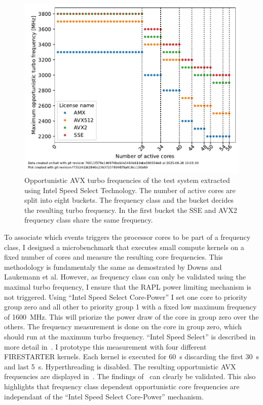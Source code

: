 \begin{figure}[]
    \centering
    \includegraphics[width=0.8\columnwidth]{fig/avx-frequency-license-bands/avx-frequency-license-bands.pdf}
    \caption{\label{fig:p0n-frequencies}Opportunistic AVX turbo frequencies of the test system extracted using Intel Speed Select Technology.
    The number of active cores are split into eight buckets. The frequency class and the bucket decides the resulting turbo frequency.
    In the first bucket the SSE and AVX2 frequency class share the same frequency.}
\end{figure}


To associate which events triggers the processor cores to be part of a frequency class, I designed a microbenchmark that executes small compute kernels on a fixed number of cores and measure the resulting core frequencies.
This methodology is fundamentaly the same as demostrated by Downs and Laukemann et al.
However, as frequency class can only be validated using the maximal turbo frequency,
I ensure that the RAPL power limiting mechanism is not triggered.
Using ``Intel Speed Select Core-Power'' I set one core to priority group zero and all other to priority group 1 with a fixed low maximum frequency of \SI{1600}{\MHz}.
This will priorize the power draw of the core in group zero over the others.
The frequency measurement is done on the core in group zero, which should run at the maximum turbo frequency.
``Intel Speed Select'' is described in more detail in~.
I prototype this measurement with four different FIRESTARTER kernels.
Each kernel is executed for \SI{60}{\s} discarding the first \SI{30}{\s} and last \SI{5}{\s}.
Hyperthreading is disabled.
The resulting opportunistic AVX frequencies are displayed in~.
The findings of~ can clearly be validated.
This also highlights that frequency class dependent opportunistic core frequencies are independant of the ``Intel Speed Select Core-Power'' mechanism.

